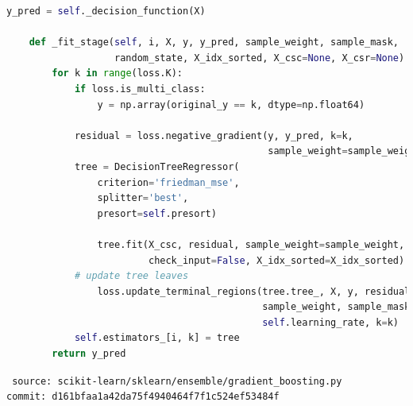 \begin{frame}[fragile]
    \begin{lstlisting}[language=Python,style=myScalastyle]
    y_pred = self._decision_function(X)

    def _fit_stage(self, i, X, y, y_pred, sample_weight, sample_mask,
                   random_state, X_idx_sorted, X_csc=None, X_csr=None):
        for k in range(loss.K):
            if loss.is_multi_class:
                y = np.array(original_y == k, dtype=np.float64)

            residual = loss.negative_gradient(y, y_pred, k=k,
                                              sample_weight=sample_weight)
            tree = DecisionTreeRegressor(
                criterion='friedman_mse',
                splitter='best',
                presort=self.presort)

                tree.fit(X_csc, residual, sample_weight=sample_weight,
                         check_input=False, X_idx_sorted=X_idx_sorted)
            # update tree leaves
                loss.update_terminal_regions(tree.tree_, X, y, residual, y_pred,
                                             sample_weight, sample_mask,
                                             self.learning_rate, k=k)
            self.estimators_[i, k] = tree
        return y_pred
    \end{lstlisting}
    {\tiny \tt
    source: scikit-learn/sklearn/ensemble/gradient\_boosting.py \\[-2ex]
    commit: d161bfaa1a42da75f4940464f7f1c524ef53484f}
\end{frame}
